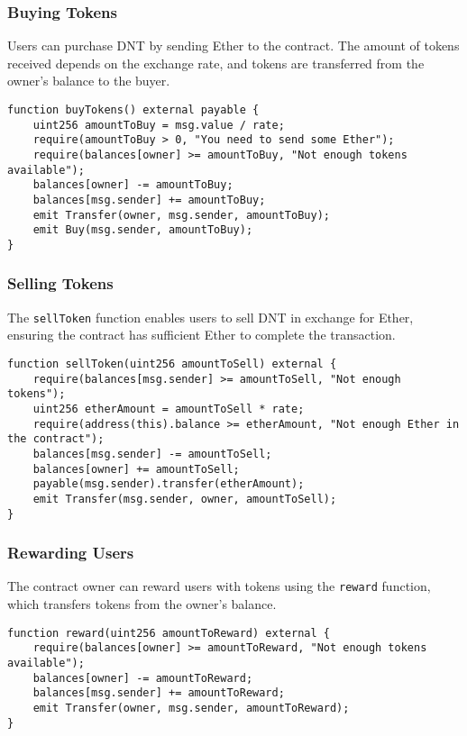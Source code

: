 \documentclass[../main.tex]{subfiles}
\begin{document}
\subsubsection{Buying Tokens}
Users can purchase DNT by sending Ether to the contract. The amount of tokens received depends on the exchange rate, and tokens are transferred from the owner's balance to the buyer.

\begin{verbatim}
function buyTokens() external payable {
    uint256 amountToBuy = msg.value / rate;
    require(amountToBuy > 0, "You need to send some Ether");
    require(balances[owner] >= amountToBuy, "Not enough tokens available");
    balances[owner] -= amountToBuy;
    balances[msg.sender] += amountToBuy;
    emit Transfer(owner, msg.sender, amountToBuy);
    emit Buy(msg.sender, amountToBuy);
}
\end{verbatim}

\subsubsection{Selling Tokens}
The \texttt{sellToken} function enables users to sell DNT in exchange for Ether, ensuring the contract has sufficient Ether to complete the transaction.

\begin{verbatim}
function sellToken(uint256 amountToSell) external {
    require(balances[msg.sender] >= amountToSell, "Not enough tokens");
    uint256 etherAmount = amountToSell * rate;
    require(address(this).balance >= etherAmount, "Not enough Ether in the contract");
    balances[msg.sender] -= amountToSell;
    balances[owner] += amountToSell;
    payable(msg.sender).transfer(etherAmount);
    emit Transfer(msg.sender, owner, amountToSell);
}
\end{verbatim}

\subsubsection{Rewarding Users}
The contract owner can reward users with tokens using the \texttt{reward} function, which transfers tokens from the owner’s balance.

\begin{verbatim}
function reward(uint256 amountToReward) external {
    require(balances[owner] >= amountToReward, "Not enough tokens available");
    balances[owner] -= amountToReward;
    balances[msg.sender] += amountToReward;
    emit Transfer(owner, msg.sender, amountToReward);
}
\end{verbatim}
\end{document}
